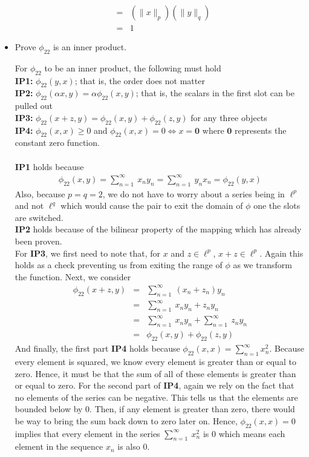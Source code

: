 \documentclass[11pt]{SelfArxOneColBMN}
\begin{document}
\begin{exercise}
\begin{itemize}
\begin{solution}
\begin{eqnarray*}
        &=& (\|x\|_p)(\|y\|_q)\\
        &=& 1
      \end{eqnarray*}
    \end{solution}
    \item Prove $\phi_{22}$ is an inner product.
    \begin{solution}
      For $\phi_{22}$ to be an inner product, the following must hold\\
      \indent \textbf{IP1: }$\phi_{22}(y,x)$; that is, the order does not matter\\
      \indent \textbf{IP2: }$\phi_{22}(\alpha x,y) = \alpha \phi_{22}(x,y)$; that is, the scalars in the first slot can be pulled out\\
      \indent \textbf{IP3: }$\phi_{22}(x + z,y) = \phi_{22}(x,y) + \phi_{22}(z,y)$ for any three objects\\
      \indent \textbf{IP4: }$\phi_{22}(x,x) \geq 0$ and $\phi_{22}(x,x) = 0 \iff x = \mathbf{0}$ where $\mathbf{0}$ represents the constant zero function.\\
      \\
      \textbf{IP1 }holds because 
      \begin{eqnarray*}
        \phi_{22}(x,y) = \sum_{n=1}^\infty\:x_ny_n = \sum_{n=1}^\infty\:y_nx_n = \phi_{22}(y,x)
      \end{eqnarray*}
      Also, because $p = q = 2$, we do not have to worry about a series being in $\ell^p$ and not $\ell^q$ which would cause the pair to exit the domain of $\phi$ one the slots are switched.\\
      \textbf{IP2 }holds because of the bilinear property of the mapping which has already been proven.\\
      For \textbf{IP3}, we first need to note that, for $x$ and $z \in \ell^p$, $x + z \in \ell^p$. Again this holds as a check preventing us from exiting the range of $\phi$ as we transform the function. Next, we consider
      \begin{eqnarray*}
        \phi_{22}(x + z,y) &=& \sum_{n=1}^\infty\:(x_n + z_n)y_n\\
        &=& \sum_{n=1}^\infty\:x_ny_n + z_ny_n\\
        &=& \sum_{n=1}^\infty\:x_ny_n + \sum_{n=1}^\infty\:z_ny_n\\
        &=& \phi_{22}(x,y) + \phi_{22}(z,y)
      \end{eqnarray*}
      And finally, the first part \textbf{IP4} holds because $\phi_{22}(x,x) = \sum_{n=1}^\infty x_n^2$. Because every element is squared, we know every element is greater than or equal to zero. Hence, it must be that the sum of all of these elements is greater than or equal to zero. For the second part of \textbf{IP4}, again we rely on the fact that no elements of the series can be negative. This tells us that the elements are bounded below by 0. Then, if any element is greater than zero, there would be way to bring the sum back down to zero later on. Hence, $\phi_{22}(x,x) = 0$ implies that every element in the series $\sum_{n=1}^\infty\:x_n^2$ is 0 which means each element in the sequence $x_n$ is also 0. 

\end{solution}
\end{itemize}
\end{exercise}
\end{document}
